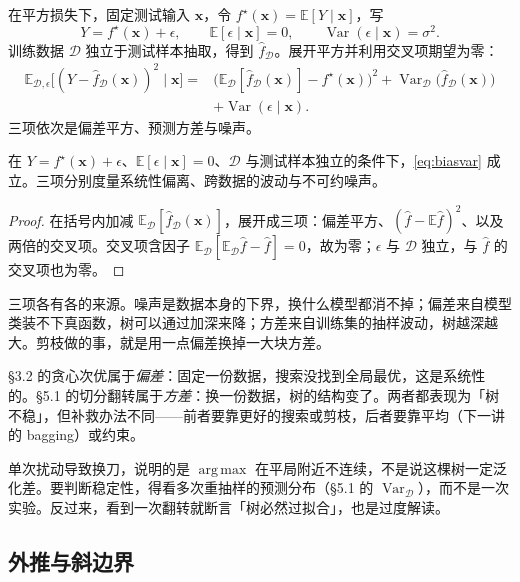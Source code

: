 \documentclass[11pt,a4paper,fontset=windows,zihao=-4]{ctexart}
\newcommand{\bx}{\boldsymbol{x}}
\DeclareMathOperator*{\argmax}{arg\,max}
\DeclareMathOperator{\Var}{Var}
\newcommand{\Dcal}{\mathcal{D}}
\begin{document}
在平方损失下，固定测试输入 $\bx$，令 $f^\star(\bx)=\mathbb E[Y\mid\bx]$，写
\[
  Y=f^\star(\bx)+\epsilon,\qquad \mathbb E[\epsilon\mid\bx]=0,\qquad \Var(\epsilon\mid\bx)=\sigma^2 .
\]
训练数据 $\Dcal$ 独立于测试样本抽取，得到 $\widehat f_\Dcal$。展开平方并利用交叉项期望为零：
\begin{equation}
\begin{aligned}
\mathbb E_{\Dcal,\epsilon}\bigl[(Y-\widehat f_\Dcal(\bx))^2\mid\bx\bigr]
={}&\bigl(\mathbb E_{\Dcal}[\widehat f_\Dcal(\bx)]-f^\star(\bx)\bigr)^2
+\Var_{\Dcal}\bigl(\widehat f_\Dcal(\bx)\bigr)\\
&+\Var(\epsilon\mid\bx).
\end{aligned}
\label{eq:biasvar}
\end{equation}
三项依次是偏差平方、预测方差与噪声。

\begin{prop}[偏差—方差分解]
在 $Y=f^\star(\bx)+\epsilon$、$\mathbb E[\epsilon\mid\bx]=0$、$\Dcal$ 与测试样本独立的条件下，\eqref{eq:biasvar} 成立。三项分别度量系统性偏离、跨数据的波动与不可约噪声。
\end{prop}

\begin{proof}
在括号内加减 $\mathbb E_\Dcal[\widehat f_\Dcal(\bx)]$，展开成三项：偏差平方、$(\widehat f-\mathbb E\widehat f)^2$、以及两倍的交叉项。交叉项含因子 $\mathbb E_\Dcal[\mathbb E_\Dcal\hat f-\hat f]=0$，故为零；$\epsilon$ 与 $\Dcal$ 独立，与 $\hat f$ 的交叉项也为零。
\end{proof}

三项各有各的来源。噪声是数据本身的下界，换什么模型都消不掉；偏差来自模型类装不下真函数，树可以通过加深来降；方差来自训练集的抽样波动，树越深越大。剪枝做的事，就是用一点偏差换掉一大块方差。

§3.2 的贪心次优属于\emph{偏差}：固定一份数据，搜索没找到全局最优，这是系统性的。§5.1 的切分翻转属于\emph{方差}：换一份数据，树的结构变了。两者都表现为「树不稳」，但补救办法不同——前者要靠更好的搜索或剪枝，后者要靠平均（下一讲的 bagging）或约束。

\begin{warn}
单次扰动导致换刀，说明的是 $\argmax$ 在平局附近不连续，不是说这棵树一定泛化差。要判断稳定性，得看多次重抽样的预测分布（§5.1 的 $\Var_\Dcal$），而不是一次实验。反过来，看到一次翻转就断言「树必然过拟合」，也是过度解读。
\end{warn}

\subsection{外推与斜边界}
\end{document}
